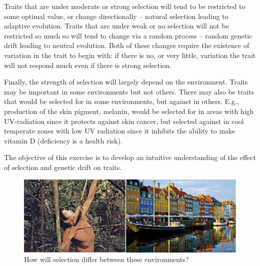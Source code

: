 \documentclass[
  a4paper]{book}
\begin{document}
Traits that are under moderate or strong selection will tend to be restricted to some optimal value, or change directionally -- natural selection leading to adaptive evolution. Traits that are under weak or no selection will not be restricted so much so will tend to change via a random process -- random genetic drift leading to neutral evolution. Both of these changes require the existence of variation in the trait to begin with: if there is no, or very little, variation the trait will not respond much even if there is strong selection.

Finally, the strength of selection will largely depend on the environment. Traits may be important in some environments but not others. There may also be traits that would be selected for in some environments, but against in others. E.g., production of the skin pigment, melanin, would be selected for in areas with high UV-radiation since it protects against skin cancer, but selected against in cool temperate zones with low UV radiation since it inhibits the ability to make vitamin D (deficiency is a health risk).

The objective of this exercise is to develop an intuitive understanding of the effect of selection and genetic drift on traits.

\begin{figure}

{\centering \includegraphics[width=0.5\linewidth]{images/huntergathererDK} 

}

\caption{How will selection differ between these environments?}\label{fig:huntergatherer}
\end{figure}
\end{document}

